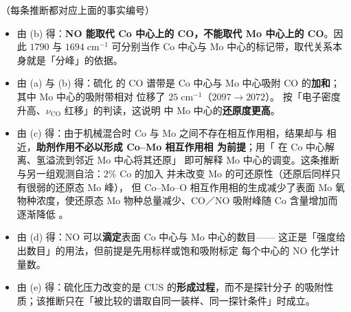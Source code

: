 \begin{infer}
（每条推断都对应上面的事实编号）
\begin{itemize}
  \item 由 (b) 得：\textbf{NO 能取代 Co 中心上的 CO，不能取代 Mo 中心上的
        CO}。因此 $1790$ 与 $1694\;\mathrm{cm^{-1}}$ 可分别当作 Co 中心与
        Mo 中心的标记带，取代关系本身就是「分峰」的依据。
  \item 由 (a) 与 (b) 得：硫化  的 CO 谱带是 Co 中心与
        Mo 中心吸附 CO 的\textbf{加和}；其中 Mo 中心的吸附带相对
         位移了 $25\;\mathrm{cm^{-1}}$（$2097\to2072$）。
        按「电子密度升高、$\nu_{\mathrm{CO}}$ 红移」的判读，这说明
         中 Mo 中心的\textbf{还原度更高}。
  \item 由 (c) 得：由于机械混合时 Co 与 Mo 之间不存在相互作用相，结果却与
         相近，\textbf{助剂作用不必以形成 Co--Mo 相互作用相
        为前提}；用「 在 Co 中心解离、氢溢流到邻近 Mo 中心将其还原」
        即可解释 Mo 中心的调变。这条推断与另一组观测自洽：$2\%$ Co 的加入
        并未改变 Mo 的可还原性（还原后同样只有很弱的还原态 Mo 峰），
        但 Co--Mo--O 相互作用相的生成减少了表面 Mo 氧物种浓度，使还原态
        Mo 物种总量减少、CO／NO 吸附峰随 Co 含量增加而逐渐降低
        。
  \item 由 (d) 得：NO 可以\textbf{滴定}表面 Co 中心与 Mo 中心的数目——
        这正是「强度给出数目」的用法，但前提是先用标样或饱和吸附标定
        每个中心的 NO 化学计量数。
  \item 由 (e) 得：硫化压力改变的是 CUS 的\textbf{形成过程}，而不是探针分子
        的吸附性质；该推断只在「被比较的谱取自同一装样、同一探针条件」时成立。
\end{itemize}
\end{infer}

